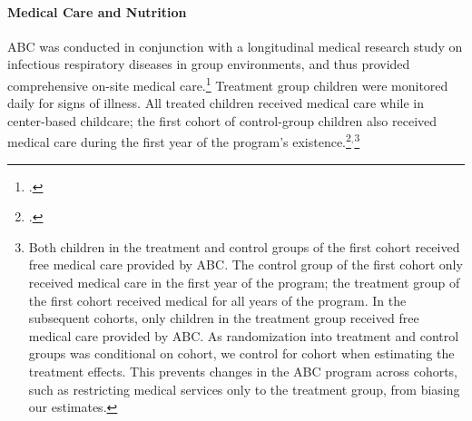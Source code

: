 \paragraph{Medical Care and Nutrition}
ABC was conducted in conjunction with a longitudinal medical research study on infectious respiratory diseases in group environments, and thus provided comprehensive on-site medical care.\footnote{\citet{Henderson-et-al_1982_NEJoM}.} Treatment group children were monitored daily for signs of illness. All treated children received medical care while in center-based childcare; the first cohort of control-group children also received medical care during the first year of the program's existence.\footnote{\citet{Ramey_Collier_etal_1976_CarolinaAbecedarianProject,Ramey_Campbell_1991_childreninpoverty,Campbell_Ramey_1994_CD}.}$^{,}$\footnote{Both children in the treatment and control groups of the first cohort received free medical care provided by ABC. The control group of the first cohort only received medical care in the first year of the program; the treatment group of the first cohort received medical for all years of the program. In the subsequent cohorts, only children in the treatment group received free medical care provided by ABC. As randomization into treatment and control groups was conditional on cohort, we control for cohort when estimating the treatment effects. This prevents changes in the ABC program across cohorts, such as restricting medical services only to the treatment group, from biasing our estimates.}\\

